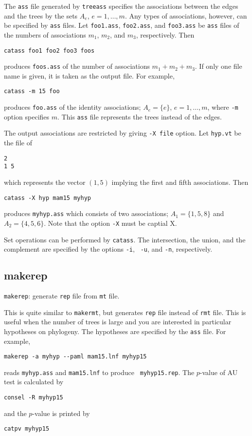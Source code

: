 \documentclass[12pt]{article}
\begin{document}
The {\tt ass} file generated by {\tt treeass} specifies the associations
between the edges and the trees by the sets $A_e$, $e=1,\ldots,m$. Any
types of associations, however, can be specified by {\tt ass} files.
Let {\tt foo1.ass}, {\tt foo2.ass}, and {\tt foo3.ass} be {\tt ass}
files of the numbers of associations $m_1$, $m_2$, and $m_3$,
respectively. Then
\begin{verbatim}
catass foo1 foo2 foo3 foos	
\end{verbatim}
produces {\tt foos.ass} of the number of associations $m_1+m_2+m_3$. If only
one file name is given, it is taken as the output file. For example,
\begin{verbatim}
catass -m 15 foo
\end{verbatim}
produces {\tt foo.ass} of the identity associations; $A_e=\{e\}$,
$e=1,\ldots,m$, where {\tt -m} option specifies $m$. This {\tt ass} file
represents the trees instead of the edges.

The output associations are restricted by giving {\tt -X file}
option. Let {\tt hyp.vt} be the file of
\begin{verbatim}
2
1 5
\end{verbatim}
which represents the vector $(1,5)$ implying the first and fifth
associations. Then
\begin{verbatim}
catass -X hyp mam15 myhyp
\end{verbatim}
produces {\tt myhyp.ass} which consists of two associations;
$A_1=\{1,5,8\}$ and $A_2=\{4,5,6\}$. Note that the option {\tt -X} must
be captial X.

Set operations can be performed by {\tt catass}.  The intersection, the
union, and the complement are specified by the options {\tt -i}, {\tt
-u}, and {\tt -n}, respectively.


\subsection{makerep}

{\tt makerep}: generate {\tt rep} file from {\tt mt} file.

This is quite similar to {\tt makermt}, but generates {\tt rep} file
instead of {\tt rmt} file.  This is useful when the number of trees is
large and you are interested in particular hypotheses on phylogeny. The
hypotheses are specified by the {\tt ass} file. For example,
\begin{verbatim}
makerep -a myhyp --paml mam15.lnf myhyp15
\end{verbatim}
reads {\tt myhyp.ass} and {\tt mam15.lnf} to produce {\tt
myhyp15.rep}. The $p$-value of AU test is calculated by
\begin{verbatim}
consel -R myhyp15
\end{verbatim}
and the $p$-value is printed by
\begin{verbatim}
catpv myhyp15	
\end{verbatim}
\end{document}
